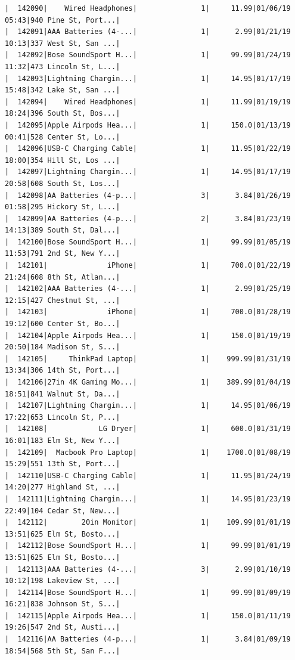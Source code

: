 \documentclass[
  letterpaper,
  DIV=11,
  numbers=noendperiod]{scrartcl}
\begin{document}
\begin{verbatim}
|  142090|    Wired Headphones|               1|     11.99|01/06/19 05:43|940 Pine St, Port...|
|  142091|AAA Batteries (4-...|               1|      2.99|01/21/19 10:13|337 West St, San ...|
|  142092|Bose SoundSport H...|               1|     99.99|01/24/19 11:32|473 Lincoln St, L...|
|  142093|Lightning Chargin...|               1|     14.95|01/17/19 15:48|342 Lake St, San ...|
|  142094|    Wired Headphones|               1|     11.99|01/19/19 18:24|396 South St, Bos...|
|  142095|Apple Airpods Hea...|               1|     150.0|01/13/19 00:41|528 Center St, Lo...|
|  142096|USB-C Charging Cable|               1|     11.95|01/22/19 18:00|354 Hill St, Los ...|
|  142097|Lightning Chargin...|               1|     14.95|01/17/19 20:58|608 South St, Los...|
|  142098|AA Batteries (4-p...|               3|      3.84|01/26/19 01:58|295 Hickory St, L...|
|  142099|AA Batteries (4-p...|               2|      3.84|01/23/19 14:13|389 South St, Dal...|
|  142100|Bose SoundSport H...|               1|     99.99|01/05/19 11:53|791 2nd St, New Y...|
|  142101|              iPhone|               1|     700.0|01/22/19 21:24|608 8th St, Atlan...|
|  142102|AAA Batteries (4-...|               1|      2.99|01/25/19 12:15|427 Chestnut St, ...|
|  142103|              iPhone|               1|     700.0|01/28/19 19:12|600 Center St, Bo...|
|  142104|Apple Airpods Hea...|               1|     150.0|01/19/19 20:50|184 Madison St, S...|
|  142105|     ThinkPad Laptop|               1|    999.99|01/31/19 13:34|306 14th St, Port...|
|  142106|27in 4K Gaming Mo...|               1|    389.99|01/04/19 18:51|841 Walnut St, Da...|
|  142107|Lightning Chargin...|               1|     14.95|01/06/19 17:22|653 Lincoln St, P...|
|  142108|            LG Dryer|               1|     600.0|01/31/19 16:01|183 Elm St, New Y...|
|  142109|  Macbook Pro Laptop|               1|    1700.0|01/08/19 15:29|551 13th St, Port...|
|  142110|USB-C Charging Cable|               1|     11.95|01/24/19 14:20|277 Highland St, ...|
|  142111|Lightning Chargin...|               1|     14.95|01/23/19 22:49|104 Cedar St, New...|
|  142112|        20in Monitor|               1|    109.99|01/01/19 13:51|625 Elm St, Bosto...|
|  142112|Bose SoundSport H...|               1|     99.99|01/01/19 13:51|625 Elm St, Bosto...|
|  142113|AAA Batteries (4-...|               3|      2.99|01/10/19 10:12|198 Lakeview St, ...|
|  142114|Bose SoundSport H...|               1|     99.99|01/09/19 16:21|838 Johnson St, S...|
|  142115|Apple Airpods Hea...|               1|     150.0|01/11/19 19:26|547 2nd St, Austi...|
|  142116|AA Batteries (4-p...|               1|      3.84|01/09/19 18:54|568 5th St, San F...|

\end{verbatim}
\end{document}
